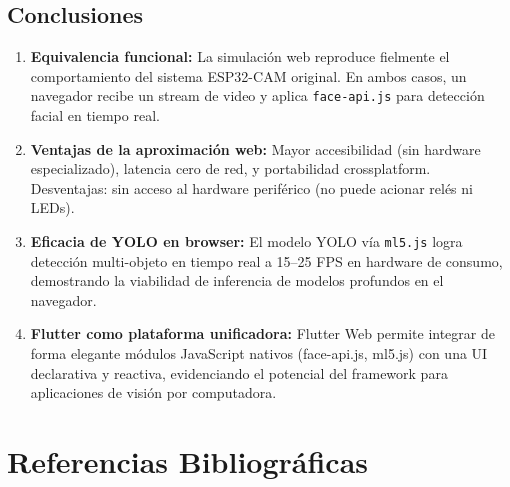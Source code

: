 \documentclass[12pt,a4paper]{article}
\begin{document}
\subsection{Conclusiones}

\begin{enumerate}[leftmargin=*, itemsep=6pt]
  \item \textbf{Equivalencia funcional:} La simulación web reproduce fielmente el comportamiento del sistema ESP32-CAM original. En ambos casos, un navegador recibe un stream de video y aplica \texttt{face-api.js} para detección facial en tiempo real.

  \item \textbf{Ventajas de la aproximación web:} Mayor accesibilidad (sin hardware especializado), latencia cero de red, y portabilidad crossplatform. Desventajas: sin acceso al hardware periférico (no puede acionar relés ni LEDs).

  \item \textbf{Eficacia de YOLO en browser:} El modelo YOLO vía \texttt{ml5.js} logra detección multi-objeto en tiempo real a 15--25 FPS en hardware de consumo, demostrando la viabilidad de inferencia de modelos profundos en el navegador.

  \item \textbf{Flutter como plataforma unificadora:} Flutter Web permite integrar de forma elegante módulos JavaScript nativos (face-api.js, ml5.js) con una UI declarativa y reactiva, evidenciando el potencial del framework para aplicaciones de visión por computadora.
\end{enumerate}

\section{Referencias Bibliográficas}
\end{document}
